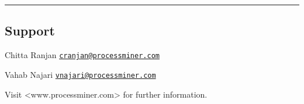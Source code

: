 \documentclass[]{article}
\begin{document}
\begin{center}\rule{0.5\linewidth}{\linethickness}\end{center}

\hypertarget{support}{%
\subsection{Support}\label{support}}

Chitta Ranjan
\href{mailto:cranjan@processminer.com}{\nolinkurl{cranjan@processminer.com}}

Vahab Najari
\href{mailto:vnajari@processminer.com}{\nolinkurl{vnajari@processminer.com}}

Visit \textless{}www.processminer.com\textgreater{} for further
information.
\end{document}
